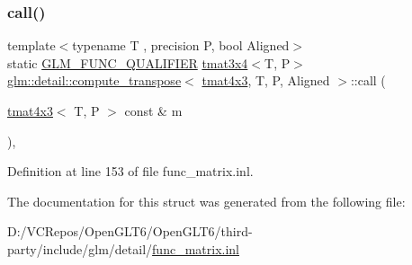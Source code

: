 \subsubsection{\texorpdfstring{call()}{call()}}
{\footnotesize\ttfamily template$<$typename T , precision P, bool Aligned$>$ \\
static \mbox{\hyperlink{setup_8hpp_a33fdea6f91c5f834105f7415e2a64407}{G\+L\+M\+\_\+\+F\+U\+N\+C\+\_\+\+Q\+U\+A\+L\+I\+F\+I\+ER}} \mbox{\hyperlink{structglm_1_1tmat3x4}{tmat3x4}}$<$T, P$>$ \mbox{\hyperlink{structglm_1_1detail_1_1compute__transpose}{glm\+::detail\+::compute\+\_\+transpose}}$<$ \mbox{\hyperlink{structglm_1_1tmat4x3}{tmat4x3}}, T, P, Aligned $>$\+::call (\begin{DoxyParamCaption}\item[{\mbox{\hyperlink{structglm_1_1tmat4x3}{tmat4x3}}$<$ T, P $>$ const \&}]{m }\end{DoxyParamCaption})\hspace{0.3cm}{\ttfamily [inline]}, {\ttfamily [static]}}



Definition at line 153 of file func\+\_\+matrix.\+inl.



The documentation for this struct was generated from the following file\+:\begin{DoxyCompactItemize}
\item 
D\+:/\+V\+C\+Repos/\+Open\+G\+L\+T6/\+Open\+G\+L\+T6/third-\/party/include/glm/detail/\mbox{\hyperlink{func__matrix_8inl}{func\+\_\+matrix.\+inl}}\end{DoxyCompactItemize}
